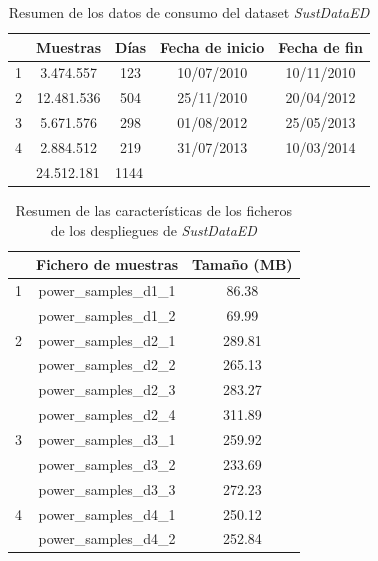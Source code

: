 \begin{table}[h!]
    \centering
    \begin{tabular}{c|c|c|cc}
    \hline
    \rowcolor[HTML]{C0C0C0} 
    \multicolumn{1}{|l|}{\cellcolor[HTML]{C0C0C0}Despliegue} & \multicolumn{1}{l|}{\cellcolor[HTML]{C0C0C0}Muestras} & \multicolumn{1}{l|}{\cellcolor[HTML]{C0C0C0}Días} & \multicolumn{1}{l|}{\cellcolor[HTML]{C0C0C0}Fecha de inicio} & \multicolumn{1}{l|}{\cellcolor[HTML]{C0C0C0}Fecha de fin} \\ \hline
    \multicolumn{1}{|c|}{1} & 3.474.557 & 123 & \multicolumn{1}{c|}{10/07/2010} & \multicolumn{1}{c|}{10/11/2010} \\ \hline
    \multicolumn{1}{|c|}{2} & 12.481.536 & 504 & \multicolumn{1}{c|}{25/11/2010} & \multicolumn{1}{c|}{20/04/2012} \\ \hline
    \multicolumn{1}{|c|}{3} & 5.671.576 & 298 & \multicolumn{1}{c|}{01/08/2012} & \multicolumn{1}{c|}{25/05/2013} \\ \hline
    \multicolumn{1}{|c|}{4} & 2.884.512 & 219 & \multicolumn{1}{c|}{31/07/2013} & \multicolumn{1}{c|}{10/03/2014} \\ \hline
    \multicolumn{1}{l|}{} & \multicolumn{1}{l|}{\cellcolor[HTML]{EFEFEF}24.512.181} & \multicolumn{1}{l|}{\cellcolor[HTML]{EFEFEF}1144} & \multicolumn{1}{l}{} & \multicolumn{1}{l}{} \\ \cline{2-3}
    \end{tabular}
    \caption{Resumen de los datos de consumo del dataset \textit{SustDataED} \cite{sustdata}}
    \label{tab:resumen}
\end{table}

\vspace{3mm}

\begin{table}[h!]
    \centering
    \begin{tabular}{|c|c|c|}
    \hline
    \rowcolor[HTML]{C0C0C0}
    \multicolumn{1}{|l|}{\cellcolor[HTML]{C0C0C0}Despliegue} & Fichero de muestras & \multicolumn{1}{l|}{\cellcolor[HTML]{C0C0C0}Tamaño (MB)} \\
    \hline
    1 & power\_samples\_d1\_1 & 86.38 \\
      & power\_samples\_d1\_2 & 69.99 \\
    \hline
    2 & power\_samples\_d2\_1 & 289.81 \\
      & power\_samples\_d2\_2 & 265.13 \\
      & power\_samples\_d2\_3 & 283.27 \\
      & power\_samples\_d2\_4 & 311.89 \\
    \hline
    3 & power\_samples\_d3\_1 & 259.92 \\
      & power\_samples\_d3\_2 & 233.69 \\
      & power\_samples\_d3\_3 & 272.23 \\
    \hline
    4 & power\_samples\_d4\_1 & 250.12 \\
      & power\_samples\_d4\_2 & 252.84 \\
    \hline
    \end{tabular}
    \caption{Resumen de las características de los ficheros de los despliegues de \textit{SustDataED}}
    \label{tab:fichconsumo}
\end{table}

